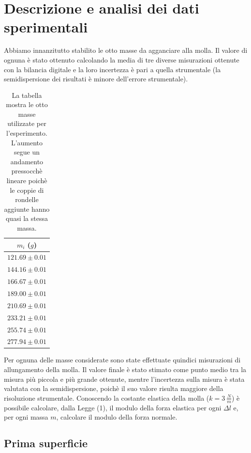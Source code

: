 \documentclass[11pt]{article}
\begin{document}
\section{Descrizione e analisi dei dati sperimentali}

Abbiamo innanzitutto stabilito le otto masse da agganciare alla molla. Il valore di ognuna è stato ottenuto calcolando la media di tre diverse misurazioni ottenute con la bilancia digitale e la loro incertezza è pari a quella strumentale (la semidispersione dei risultati è minore dell'errore strumentale).

\begin{table}[H]
\centering
\begin{tabular}{|c|}
\hline
\textbf{$m_i$ ($g$)}\\
\hline
$121.69\pm 0.01$ \\
$144.16\pm 0.01$ \\
$166.67\pm 0.01$ \\
$189.00\pm 0.01$ \\
$210.69\pm 0.01$ \\
$233.21\pm 0.01$ \\
$255.74\pm 0.01$ \\
$277.94\pm 0.01$ \\
\hline
\end{tabular}
\caption{La tabella mostra le otto masse utilizzate per l'esperimento. L'aumento segue un andamento pressocchè lineare poichè le coppie di rondelle aggiunte hanno quasi la stessa massa.}
\label{tab:}
\end{table}
Per ognuna delle masse considerate sono state effettuate quindici misurazioni di allungamento della molla. Il valore finale è stato stimato come punto medio tra la misura più piccola e più grande ottenute, mentre l’incertezza sulla misura è stata valutata con la semidispersione, poichè il suo valore risulta maggiore della risoluzione strumentale. Conoscendo la costante elastica della molla ($k=3\ \frac{N}{m}$) è possibile calcolare, dalla Legge (1), il modulo della forza elastica per ogni $\Delta l$ e, per ogni massa $m$, calcolare il modulo della forza normale.

\subsection{Prima superficie}
\end{document}
